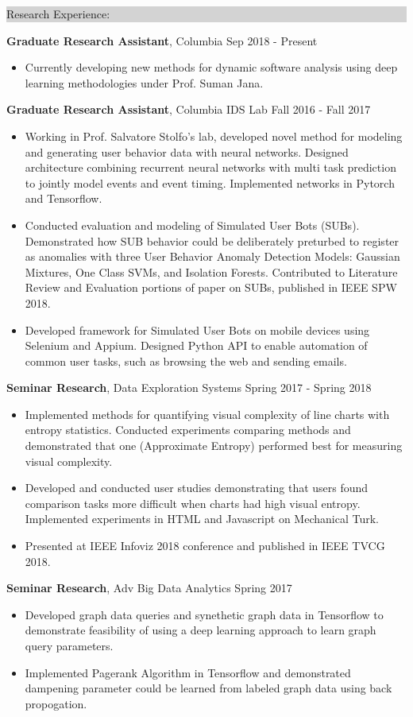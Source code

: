 \documentclass{article} %
\newcommand{\rsection}[1]{
\hspace{-0.4cm}
\colorbox{lightgrey}{
\begin{minipage}{1.07\linewidth}
\vspace{0.25cm}
\fontsize{14pt}{16pt}\selectfont #1 
\vspace{0.15cm}
\end{minipage}
}
\vspace*{-0.2cm}
}
\newcommand{\rjob}[2]{
\vspace{0.1cm}
\hspace*{-0.3cm}  
{\fontsize{10pt}{12pt}\selectfont #1} \hfill #2 
\vspace*{0.1cm} 
\hspace*{-1.2cm}
}
\newenvironment{ritemize}{
\hspace*{-0.8cm} 
\begin{minipage}{1.05\linewidth}
\begin{itemize}
}{
\end{itemize}
\end{minipage}
\vspace{-0.2cm}
}
\newcommand{\ritem}{
\item[-]
}
\begin{document}
\rsection{Research Experience:}

\rjob{\textbf{Graduate Research Assistant}, Columbia}{Sep 2018 - Present}\\
\begin{ritemize}
  \ritem Currently developing new methods for dynamic software analysis using deep learning methodologies under Prof. Suman Jana.
\end{ritemize}

\rjob{\textbf{Graduate Research Assistant}, Columbia IDS Lab}{Fall 2016 - Fall 2017}\\
\begin{ritemize}
  \ritem Working in Prof. Salvatore Stolfo's lab, developed novel method for modeling and generating user behavior data with neural networks. Designed architecture combining recurrent neural networks with multi task prediction to jointly model events and event timing. Implemented networks in Pytorch and Tensorflow.
  \ritem Conducted evaluation and modeling of Simulated User Bots (SUBs). Demonstrated how SUB behavior could be deliberately preturbed to register as anomalies with three User Behavior Anomaly Detection Models: Gaussian Mixtures, One Class SVMs, and Isolation Forests. Contributed to Literature Review and Evaluation portions of paper on SUBs, published in IEEE SPW 2018.
  \item Developed framework for Simulated User Bots on mobile devices using Selenium and Appium. Designed Python API to enable automation of common user tasks, such as browsing the web and sending emails.
\end{ritemize}

\rjob{\textbf{Seminar Research}, Data Exploration Systems}{Spring 2017 - Spring 2018}\\
\begin{ritemize}
    \ritem Implemented methods for quantifying visual complexity of line charts with entropy statistics. Conducted experiments comparing methods and demonstrated that one (Approximate Entropy) performed best for measuring visual complexity.
  \ritem Developed and conducted user studies demonstrating that users found comparison tasks more difficult when charts had high visual entropy. Implemented experiments in HTML and Javascript on Mechanical Turk.
  \ritem Presented at IEEE Infoviz 2018 conference and published in IEEE TVCG 2018.
\end{ritemize}

\rjob{\textbf{Seminar Research}, Adv Big Data Analytics}{Spring 2017}\\
\begin{ritemize}
  \ritem Developed graph data queries and synethetic graph data in Tensorflow to demonstrate feasibility of using a deep learning approach to learn graph query parameters.
  \ritem Implemented Pagerank Algorithm in Tensorflow and demonstrated dampening parameter could be learned from labeled graph data using back propogation. 
\end{ritemize}
\end{document}
